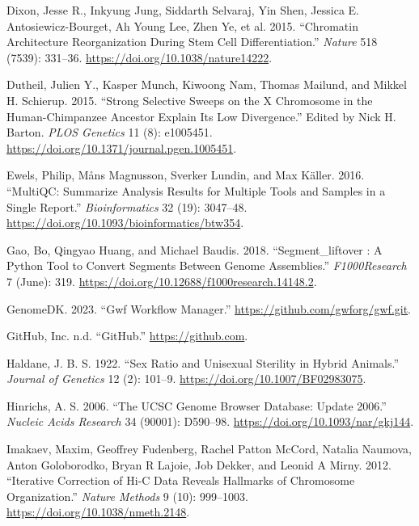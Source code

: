 \documentclass[
  11pt,
  a4paper,
]{scrbook}
\newlength{\cslhangindent}
\newenvironment{CSLReferences}[2] %
 {\begin{list}{}{%
  \setlength{\itemindent}{0pt}
  \setlength{\leftmargin}{0pt}
  \setlength{\parsep}{0pt}
  \ifodd #1
   \setlength{\leftmargin}{\cslhangindent}
   \setlength{\itemindent}{-1\cslhangindent}
  \fi
  \setlength{\itemsep}{#2\baselineskip}}}
 {\end{list}}
\let\oldemph\emph
\renewcommand\emph[1]{\oldemph{\color{gray}#1}}
\begin{document}
\begin{CSLReferences}{1}{0}
Dixon, Jesse R., Inkyung Jung, Siddarth Selvaraj, Yin Shen, Jessica E.
Antosiewicz-Bourget, Ah Young Lee, Zhen Ye, et al. 2015. {``Chromatin
Architecture Reorganization During Stem Cell Differentiation.''}
\emph{Nature} 518 (7539): 331--36.
\url{https://doi.org/10.1038/nature14222}.

Dutheil, Julien Y., Kasper Munch, Kiwoong Nam, Thomas Mailund, and
Mikkel H. Schierup. 2015. {``Strong {Selective Sweeps} on the {X
Chromosome} in the {Human-Chimpanzee Ancestor Explain Its Low
Divergence}.''} Edited by Nick H. Barton. \emph{PLOS Genetics} 11 (8):
e1005451. \url{https://doi.org/10.1371/journal.pgen.1005451}.

Ewels, Philip, Måns Magnusson, Sverker Lundin, and Max Käller. 2016.
{``{MultiQC}: Summarize Analysis Results for Multiple Tools and Samples
in a Single Report.''} \emph{Bioinformatics} 32 (19): 3047--48.
\url{https://doi.org/10.1093/bioinformatics/btw354}.

Gao, Bo, Qingyao Huang, and Michael Baudis. 2018. {``Segment\_liftover :
A {Python} Tool to Convert Segments Between Genome Assemblies.''}
\emph{F1000Research} 7 (June): 319.
\url{https://doi.org/10.12688/f1000research.14148.2}.

GenomeDK. 2023. {``Gwf Workflow Manager.''}
\url{https://github.com/gwforg/gwf.git}.

GitHub, Inc. n.d. {``GitHub.''} \url{https://github.com}.

Haldane, J. B. S. 1922. {``Sex Ratio and Unisexual Sterility in Hybrid
Animals.''} \emph{Journal of Genetics} 12 (2): 101--9.
\url{https://doi.org/10.1007/BF02983075}.

Hinrichs, A. S. 2006. {``The {UCSC Genome Browser Database}: Update
2006.''} \emph{Nucleic Acids Research} 34 (90001): D590--98.
\url{https://doi.org/10.1093/nar/gkj144}.

Imakaev, Maxim, Geoffrey Fudenberg, Rachel Patton McCord, Natalia
Naumova, Anton Goloborodko, Bryan R Lajoie, Job Dekker, and Leonid A
Mirny. 2012. {``Iterative Correction of {Hi-C} Data Reveals Hallmarks of
Chromosome Organization.''} \emph{Nature Methods} 9 (10): 999--1003.
\url{https://doi.org/10.1038/nmeth.2148}.


\end{CSLReferences}
\end{document}
